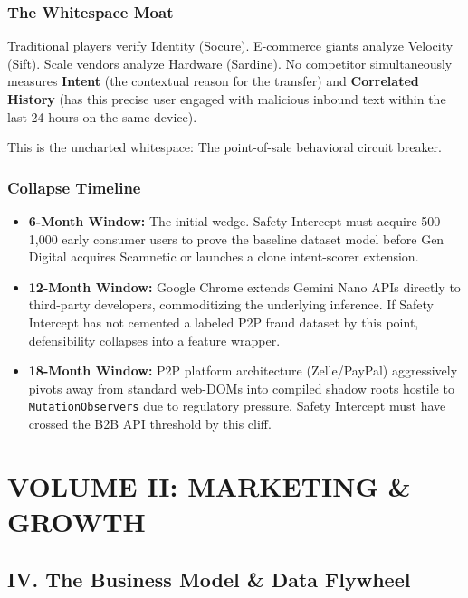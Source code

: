 \documentclass[
]{article}
\providecommand{\tightlist}{%
  \setlength{\itemsep}{0pt}\setlength{\parskip}{0pt}}
\begin{document}
\subsubsection{The Whitespace Moat}\label{the-whitespace-moat}

Traditional players verify Identity (Socure). E-commerce giants analyze
Velocity (Sift). Scale vendors analyze Hardware (Sardine). No competitor
simultaneously measures \textbf{Intent} (the contextual reason for the
transfer) and \textbf{Correlated History} (has this precise user engaged
with malicious inbound text within the last 24 hours on the same
device).

This is the uncharted whitespace: The point-of-sale behavioral circuit
breaker.

\subsubsection{Collapse Timeline}\label{collapse-timeline}

\begin{itemize}
\tightlist
\item
  \textbf{6-Month Window:} The initial wedge. Safety Intercept must
  acquire 500-1,000 early consumer users to prove the baseline dataset
  model before Gen Digital acquires Scamnetic or launches a clone
  intent-scorer extension.
\item
  \textbf{12-Month Window:} Google Chrome extends Gemini Nano APIs
  directly to third-party developers, commoditizing the underlying
  inference. If Safety Intercept has not cemented a labeled P2P fraud
  dataset by this point, defensibility collapses into a feature wrapper.
\item
  \textbf{18-Month Window:} P2P platform architecture (Zelle/PayPal)
  aggressively pivots away from standard web-DOMs into compiled shadow
  roots hostile to \texttt{MutationObservers} due to regulatory
  pressure. Safety Intercept must have crossed the B2B API threshold by
  this cliff.
\end{itemize}

\section{VOLUME II: MARKETING \&
GROWTH}\label{volume-ii-marketing-growth}

\subsection{IV. The Business Model \& Data
Flywheel}\label{iv.-the-business-model-data-flywheel}
\end{document}
